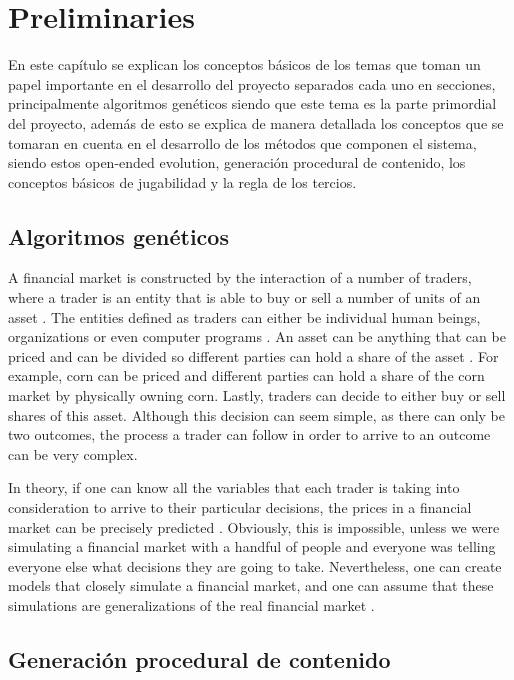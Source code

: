 \chapter{Preliminaries}
\label{chapter:preliminaries}

En este capítulo se explican los conceptos básicos de los temas que toman un
papel importante en el desarrollo del proyecto separados cada uno en secciones,
principalmente algoritmos genéticos siendo que este tema es la parte primordial
del proyecto, además de esto se explica de manera detallada los conceptos que se
tomaran en cuenta en el desarrollo de los métodos que componen el sistema,
siendo estos open-ended evolution, generación procedural de contenido, los
conceptos básicos de jugabilidad y la regla de los tercios.

\section{Algoritmos genéticos}
\label{section:financial-market}

A financial market is constructed by the interaction of a number of traders,
where a trader is an entity that is able to buy or sell a number of units of an
asset \cite{Huang2009}. The entities defined as traders can either be individual
human beings, organizations or even computer programs \cite{Lu2009}. An asset
can be anything that can be priced and can be divided so different parties can
hold a share of the asset \cite{Avramov2006}. For example, corn can be priced
and different parties can hold a share of the corn market by physically owning
corn. Lastly, traders can decide to either buy or sell shares of this
asset. Although this decision can seem simple, as there can only be two
outcomes, the process a trader can follow in order to arrive to an outcome can
be very complex.

In theory, if one can know all the variables that each trader is taking into
consideration to arrive to their particular decisions, the prices in a financial
market can be precisely predicted \cite{Garcia-Almanza2006}. Obviously, this is
impossible, unless we were simulating a financial market with a handful of
people and everyone was telling everyone else what decisions they are going to
take. Nevertheless, one can create models that closely simulate a financial
market, and one can assume that these simulations are generalizations of the
real financial market \cite{Cai2013}.

\section{Generación procedural de contenido}
\label{section:PCG}

